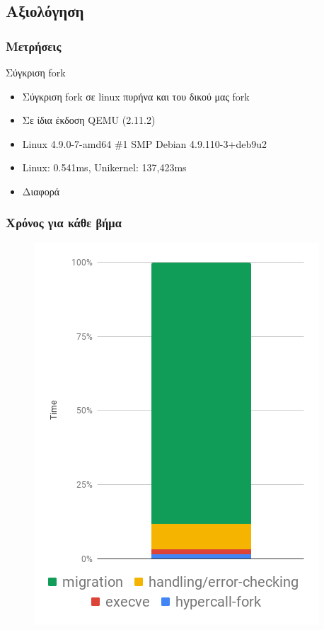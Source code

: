 \documentclass[red,slidestop,notes,compress,mathserif]{beamer}
\begin{document}
\subsection{Αξιολόγηση}
\begin{frame}
\frametitle{Μετρήσεις}
\begin{block}{Σύγκριση fork}
\begin{itemize}
\item Σύγκριση fork σε linux πυρήνα και του δικού μας fork 
\item Σε ίδια έκδοση QEMU (2.11.2)
\item Linux 4.9.0-7-amd64 \#1 SMP Debian 4.9.110-3+deb9u2
\item Linux: 0.541ms, Unikernel: 137,423ms
\item Διαφορά
\end{itemize}
\end{block}
\end{frame}

\begin{frame}
\frametitle{Χρόνος για κάθε βήμα}
\begin{figure}
\center
\includegraphics[scale=0.42]{figures/fork_breakdown.png}
\end{figure}
\end{frame}
\end{document}
